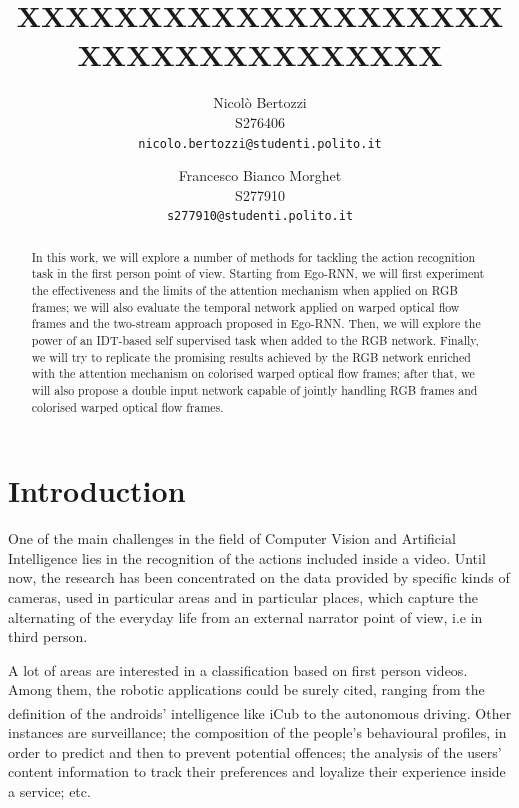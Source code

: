 \documentclass[10pt,twocolumn,letterpaper]{article}
\begin{document}
\title{XXXXXXXXXXXXXXXXXXXXXXXXXXXXXXXXXXX}

\author{Nicolò Bertozzi\\
S276406\\
{\tt\small nicolo.bertozzi@studenti.polito.it}
\and
Francesco Bianco Morghet\\
S277910\\
{\tt\small s277910@studenti.polito.it}
}

\maketitle


\begin{abstract}
	In this work, we will explore a number of methods for tackling the action recognition task in the first person point of view. Starting from Ego-RNN, we will first experiment the effectiveness and the limits of the attention mechanism when applied on RGB frames; we will also evaluate the temporal network applied on warped optical flow frames and the two-stream approach proposed in Ego-RNN. Then, we will explore the power of an IDT-based self supervised task when added to the RGB network. Finally, we will try to replicate the promising results achieved by the RGB network enriched with the attention mechanism on colorised warped optical flow frames; after that, we will also propose a double input network capable of jointly handling RGB frames and colorised warped optical flow frames.
\end{abstract}


\section{Introduction}

One of the main challenges in the field of Computer Vision and Artificial Intelligence lies in the recognition of the actions included inside a video. Until now, the research has been concentrated on the data provided by specific kinds of cameras, used in particular areas and in particular places, which capture the alternating of the everyday life from an external narrator point of view, i.e in third person.

A lot of areas are interested in a classification based on first person videos. Among them, the robotic applications could be surely cited, ranging from the definition of the androids’ intelligence like iCub\textsuperscript{\textcopyright} to the autonomous driving. Other instances are surveillance; the composition of the people’s behavioural profiles, in order to predict and then to prevent potential offences; the analysis of the users’ content information to track their preferences and loyalize their experience inside a service; etc.
\end{document}
